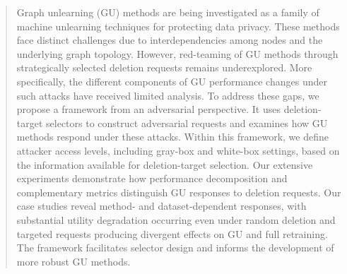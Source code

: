 \begin{abstract}
Graph unlearning (GU) methods are being investigated as a family of machine unlearning techniques for protecting data privacy. These methods face distinct challenges due to interdependencies among nodes and the underlying graph topology. However, red-teaming of GU methods through strategically selected deletion requests remains underexplored. More specifically, the different components of GU performance changes under such attacks have received limited analysis. To address these gaps, we propose a framework from an adversarial perspective. It uses deletion-target selectors to construct adversarial requests and examines how GU methods respond under these attacks. Within this framework, we define attacker access levels, including gray-box and white-box settings, based on the information available for deletion-target selection. Our extensive experiments demonstrate how performance decomposition and complementary metrics distinguish GU responses to deletion requests. Our case studies reveal method- and dataset-dependent responses, with substantial utility degradation occurring even under random deletion and targeted requests producing divergent effects on GU and full retraining. The framework facilitates selector design and informs the development of more robust GU methods.
\end{abstract}
